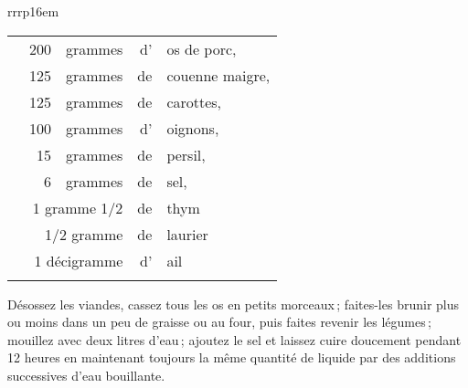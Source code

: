 \begin{longtable}{rrrp{16em}}
{\begin{tabular}{rrrrl}
              \hspace{8em}  &       200 & grammes & d' & os de porc,                          \\ 
              \hspace{8em}  &       125 & grammes & de & couenne maigre,                      \\ 
              \hspace{8em}  &       125 & grammes & de & carottes,                            \\ 
              \hspace{8em}  &       100 & grammes & d' & oignons,                             \\ 
              \hspace{8em}  &        15 & grammes & de & persil,                              \\ 
              \hspace{8em}  &         6 & grammes & de & sel,                                 \\ 
              \hspace{8em}  & \multicolumn{2}{r}{1 gramme 1/2} & de & thym                    \\ 
              \hspace{8em}  & \multicolumn{2}{r}{1/2 gramme}   & de & laurier                 \\ 
              \hspace{8em}  & \multicolumn{2}{r}{1 décigramme} & d' & ail                     \\ 
              \hspace{8em}  &           &         &    &                                      \\ 
              \end{tabular}
                                                     \protect\endgraf
                                                    Désossez les viandes, cassez tous les os en petits 
                                                    morceaux ; faites-les brunir plus ou moins dans un 
                                                    peu de graisse ou au four, puis faites revenir les
                                                    légumes ; mouillez avec deux litres d'eau ; ajoutez 
                                                    le sel et laissez cuire doucement pendant 12 heures 
                                                    en maintenant toujours la même quantité de liquide
                                                    par des additions successives d'eau bouillante. 
}
\end{longtable}
